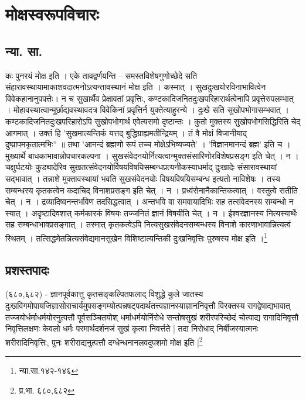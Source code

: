 \chapter{मोक्षस्वरूपविचारः}

\section{न्या. सा.}कः पुनरयं मोक्ष इति । एके तावद्वर्णयन्ति – समस्तविशेषगुणोच्छेदे सति संहारावस्थायामाकाशवदात्मनोऽत्यन्तावस्थानं मोक्ष इति । कस्मात् । सुखदुःखयोरविनाभावित्वेन विवेकहानानुपपत्तेः। न च सुखार्थैव प्रेक्षावतां प्रवृत्तिः, कण्टकादिजनितदुःखपरिहारार्थत्वेनापि प्रवृत्तेरुपलम्भात् । मोहावस्थात्वान्मूर्छाद्यवस्थावदत्र विवेकिनां प्रवृत्तिर्न युक्तेत्याहुरन्ये । दुःखे सति सुखोपभोगासम्भवात् । कण्टकादिजनितदुःखपरिहारोऽपि सुखोपभोगार्थ एवेत्यसमो दृष्टान्तः । कुतो मुक्तस्य सुखोपभोगसिद्धिरिति चेद् आगमात् । उक्तं हि 
’सुखमात्यन्तिकं यत्तद् बुद्धिग्राह्यमतीन्द्रियम् ।
तं वै मोक्षं विजानीयाद् दुष्प्रापमकृतात्मभिः” ॥
तथा
’आनन्दं ब्रह्मणो रूपं तच्च मोक्षेऽभिव्यज्यते’ । ’विज्ञानमानन्दं ब्रह्म’ इति च ।
मुख्यार्थे बाधकाभावान्नोपचारकल्पना । सुखसंवेदनयोर्नित्यत्वान्मुक्तसंसारिणोरविशेषप्रसङ्ग इति चेत् । न । चक्षुर्घटयोः कुड्यादेरिव सुखतत्संवेदनयोर्विषयविषयिसम्बन्धप्रत्यनीकस्याधर्माद् दुःखादेः संसारावस्थायां सद्भावात् । तन्नाशे मुक्तावस्थायां भवति सुखसंवेदनयोः विषयविषयिसम्बन्ध इत्यतो नाविशेषः । तस्य सम्बन्धस्य कृतकत्वेन कदाचिद् विनाशप्रसङ्ग इति चेत् । न । प्रध्वंसेनानैकान्तिकत्वात् । वस्तुत्वे सतीति चेत् । न । द्रव्यादिष्वनन्तर्भावेण तदसिद्धत्वात् । अन्तर्भावे वा समवायादिभिः सह तत्संवेदनस्य सम्बन्धो न स्यात् । अदृष्टादिवशात् कर्मकारकं विषयः तज्जनितं ज्ञानं विषयीति चेत् । न । ईश्वरज्ञानस्य नित्यस्यार्थेः सह सम्बन्धाभावप्रसङ्गात् । तस्मात् कृतकत्वेऽपि नित्यसुखसंवेदनसम्बन्धस्य विनाशे कारणाभावान्नित्यत्वं स्थितम् । तत्सिद्धमेतन्नित्यसंवेद्यमानसुखेन विशिष्टात्यन्तिकी दुःखनिवृत्तिः पुरुषस्य मोक्ष इति ।\footnote{न्या.सा.१४२-१४६}

\section{प्रशस्तपादः}(६८०,६८२) - ज्ञानपूर्वकात्तु कृतसङ्कल्पितफलाद् विशुद्धे कुले जातस्य दुःखविगमोपायजिज्ञासोराचार्यमुपसङ्गम्योत्पन्नषट्पदार्थतत्त्वज्ञानस्याज्ञाननिवृत्तौ विरक्तस्य रागद्वेषाद्यभावात् तज्जयोर्धर्माधर्मयोरनुत्पत्तौ पूर्वसञ्चितयोश् धर्माधर्मयोर्निरोधे सन्तोषसुखं शरीरपरिच्छेदं चोत्पाद्य रागादिनिवृत्तौ निवृत्तिलक्षणः केवलो धर्मः परमार्थदर्शनजं सुखं कृत्वा निवर्त्तते | तदा निरोधाद् निर्बीजस्यात्मनः शरीरादिनिवृत्तिः, पुनः शरीराद्यनुत्पत्तौ दग्धेन्धनानलवदुपशमो मोक्ष इति |\footnote{प्र.भा. ६८०,६८२}

